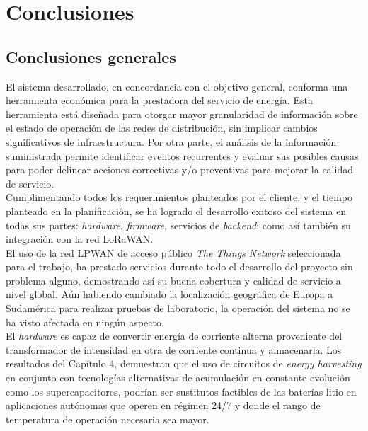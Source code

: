 
\chapter{Conclusiones} %

\label{Chapter5} %




\section{Conclusiones generales }
El sistema desarrollado, en concordancia con el objetivo general, conforma una herramienta económica para la prestadora del servicio de energía. Esta herramienta está diseñada para otorgar mayor granularidad de información sobre el estado de operación de las redes de distribución, sin implicar cambios significativos de infraestructura. Por otra parte, el análisis de la información suministrada permite identificar eventos recurrentes y evaluar sus posibles causas para poder delinear acciones correctivas y/o preventivas para mejorar la calidad de servicio.\\
Cumplimentando todos los requerimientos planteados por el cliente, y el tiempo planteado en la planificación, se ha logrado el desarrollo exitoso del sistema en todas sus partes: \textit{hardware}, \textit{firmware}, servicios de \textit{backend}; como así también su integración con la red LoRaWAN.\\
El uso de la red LPWAN de acceso público \textit{The Things Network} seleccionada para el trabajo, ha prestado servicios durante todo el desarrollo del proyecto sin problema alguno, demostrando así su buena cobertura y calidad de servicio a nivel global. A\'{u}n habiendo cambiado la localización geográfica de Europa a Sudamérica para realizar pruebas de laboratorio, la operación del sistema no se ha visto afectada en ningún aspecto.\\
El \textit{hardware} es capaz de convertir energía de corriente alterna proveniente del transformador de intensidad en otra de corriente continua y almacenarla. Los resultados del Capítulo 4, demuestran que el uso de circuitos de \textit{energy harvesting} en conjunto con tecnologías alternativas de acumulación en constante evolución como los supercapacitores, podrían ser sustitutos factibles de las baterías litio en aplicaciones autónomas que operen en régimen 24/7 y donde el rango de temperatura de operación necesaria sea mayor.\\
